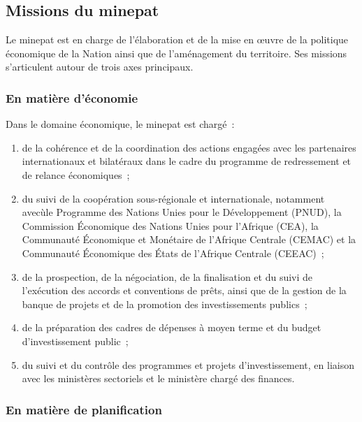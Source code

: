 \documentclass[12pt, a4paper, oneside]{report}
\begin{document}
\subsection[Missions du MINEPAT]{Missions du \gls{minepat}}

Le \gls{minepat} est en charge de l'élaboration et de la mise en \oe uvre de la
politique économique de la Nation ainsi que de l'aménagement du territoire. Ses
missions s'articulent autour de trois axes principaux.

\subsubsection{En matière d'économie}

Dans le domaine économique, le \gls{minepat} est chargé~:
\begin{enumerate}
	\item de la cohérence et de la coordination des actions engagées avec les partenaires
	internationaux et bilatéraux dans le cadre du programme de redressement et de
	relance économiques~;
	\item du suivi de la coopération sous-régionale et internationale, notamment avecùle
	Programme des Nations Unies pour le Développement (PNUD), la Commission
	Économique des Nations Unies pour l'Afrique (CEA), la Communauté Économique
	et Monétaire de l'Afrique Centrale (CEMAC) et la Communauté Économique des
	États de l'Afrique Centrale (CEEAC)~;
	\item de la prospection, de la négociation, de la finalisation et du suivi de
	l'exécution des accords et conventions de prêts, ainsi que de la gestion de
	la banque de projets et de la promotion des investissements publics~;
	\item de la préparation des cadres de dépenses à moyen terme et du budget
	d'investissement public~;
	\item du suivi et du contrôle des programmes et projets d'investissement, en liaison
	avec les ministères sectoriels et le ministère chargé des finances.
\end{enumerate}

\subsubsection{En matière de planification}
\end{document}
